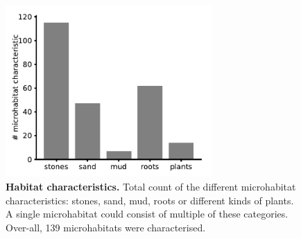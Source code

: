 \begin{figure}[H]
    \centering
    \includegraphics[width=0.7\textwidth]{pictures/Results/JULE_habitat_ccharacteristics.pdf}
    \caption{\textbf{Habitat characteristics.} Total count of the different microhabitat characteristics: stones, sand, mud, roots or different kinds of plants. A single microhabitat could consist of multiple of these categories. Over-all, 139 microhabitats were characterised.}
    \label{fig:habitat_count}
\end{figure}

